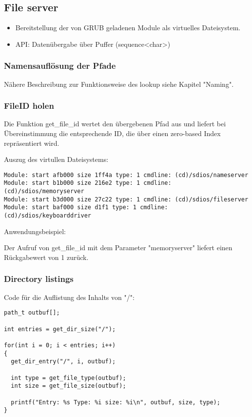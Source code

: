 \subsection{File server}





\begin{itemize}
	\item Bereitstellung der von GRUB geladenen Module als virtuelles Dateisystem.
	
	\item API: Datenübergabe über Puffer (sequence<char>)
\end{itemize}

\subsubsection{Namensauflösung der Pfade}

Nähere Beschreibung zur Funktionsweise des lookup siehe Kapitel "Naming".

\subsubsection{FileID holen}

Die Funktion get\_file\_id wertet den übergebenen Pfad aus und liefert bei Übereinstimmung
die entsprechende ID, die über einen zero-based Index repräsentiert wird.

Auszug des virtullen Dateisystems:
\begin{lstlisting}
Module: start afb000 size 1ff4a type: 1 cmdline: (cd)/sdios/nameserver
Module: start b1b000 size 216e2 type: 1 cmdline: (cd)/sdios/memoryserver
Module: start b3d000 size 27c22 type: 1 cmdline: (cd)/sdios/fileserver
Module: start baf000 size d1f1 type: 1 cmdline: (cd)/sdios/keyboarddriver
\end{lstlisting}

Anwendungsbeispiel:

Der Aufruf von get\_file\_id mit dem Parameter "memoryserver" liefert einen Rückgabewert von 1 zurück.

\subsubsection{Directory listings}

Code für die Auflistung des Inhalts von "/":

\begin{lstlisting}
path_t outbuf[];

int entries = get_dir_size("/");

for(int i = 0; i < entries; i++)
{
  get_dir_entry("/", i, outbuf);
  
  int type = get_file_type(outbuf);
  int size = get_file_size(outbuf);
  
  printf("Entry: %s Type: %i size: %i\n", outbuf, size, type);
}
\end{lstlisting}

